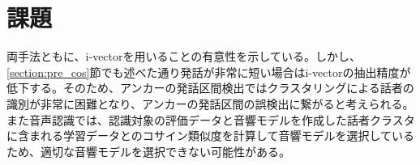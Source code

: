 \section{課題}
両手法ともに、i-vectorを用いることの有意性を示している。しかし、\ref{section:pre_cos}節でも述べた通り発話が非常に短い場合はi-vectorの抽出精度が低下する。そのため、アンカーの発話区間検出ではクラスタリングによる話者の識別が非常に困難となり、アンカーの発話区間の誤検出に繋がると考えられる。また音声認識では、認識対象の評価データと音響モデルを作成した話者クラスタに含まれる学習データとのコサイン類似度を計算して音響モデルを選択しているため、適切な音響モデルを選択できない可能性がある。